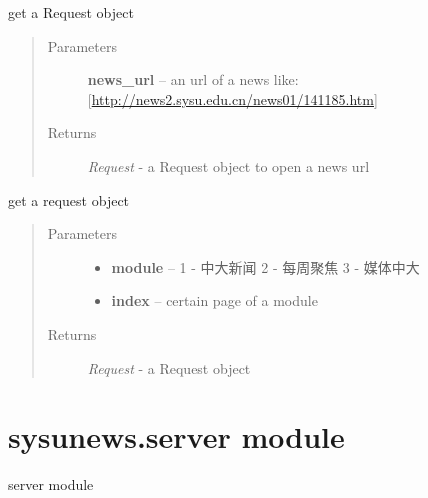\documentclass[letterpaper,10pt,english]{sphinxmanual}
\begin{document}

\begin{fulllineitems}
\label{sysunews:sysunews.post_module.req_get_news}
get a Request object
\begin{quote}\begin{description}
\item[{Parameters}] \leavevmode
\textbf{news\_url} -- an url of a news like: {[}\href{http://news2.sysu.edu.cn/news01/141185.htm}{http://news2.sysu.edu.cn/news01/141185.htm}{]}

\item[{Returns}] \leavevmode
\emph{Request} - a Request object to open a news url

\end{description}\end{quote}

\end{fulllineitems}


\begin{fulllineitems}
\label{sysunews:sysunews.post_module.req_get_news_urls}
get a request object
\begin{quote}\begin{description}
\item[{Parameters}] \leavevmode\begin{itemize}
\item {} 
\textbf{module} -- 1  - 中大新闻 2  - 每周聚焦 3  - 媒体中大

\item {} 
\textbf{index} -- certain page of a module

\end{itemize}

\item[{Returns}] \leavevmode
\emph{Request} - a Request object

\end{description}\end{quote}

\end{fulllineitems}



\section{sysunews.server module}
\label{sysunews:module-sysunews.server}\label{sysunews:sysunews-server-module}
server module
\end{document}
